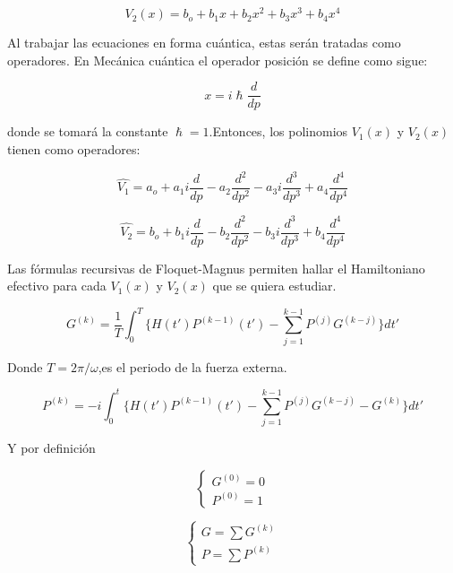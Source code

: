 \begin{equation}
    V_2(x) = b_o + b_1x + b_2x^2 + b_3x^3 + b_4x^4
\end{equation}

Al trabajar las ecuaciones en forma cuántica, estas serán tratadas como operadores. En Mecánica cuántica el operador posición se define como sigue:

\begin{equation}
    x = i \hslash \frac{d}{dp} 
\end{equation}

donde se tomará la constante $\hslash = 1$.Entonces, los polinomios $V_1(x)$ y $V_2(x)$ tienen como operadores:  

\begin{equation}
    \hat{V_1} = a_o + a_1 i \frac{d}{dp} - a_2 \frac{d^2}{dp^2} - a_3 i \frac{d^3}{dp^3} + a_4\frac{d^4}{dp^4} 
\end{equation}

\begin{equation}
    \hat{V_2} = b_o + b_1 i \frac{d}{dp} - b_2 \frac{d^2}{dp^2} - b_3 i \frac{d^3}{dp^3} + b_4\frac{d^4}{dp^4} 
\end{equation}

Las fórmulas recursivas de Floquet-Magnus permiten hallar el Hamiltoniano efectivo para cada $V_1(x)$ y $V_2(x)$ que se quiera estudiar. 

\begin{equation}
    G^{(k)}=\frac{1}{T}\int^{T}_{0}\{ H(t')P^{(k-1)}(t')-\sum^{k-1}_{j=1} P^{(j)}G^{(k-j)}\}dt'
\end{equation}

Donde $T=2\pi/\omega$,es el periodo de la fuerza externa.

\begin{equation}
    P^{(k)}=-i\int^{t}_{0}\{ H(t')P^{(k-1)}(t')-\sum^{k-1}_{j=1} P^{(j)}G^{(k-j)}-G^{(k)}\}dt'
\end{equation}

Y por definición 

\begin{equation}
    \begin{cases}
        G^{(0)}=0\\
        P^{(0)}=1
    \end{cases}
\end{equation}

\begin{equation}
\begin{cases}
    G=\sum G^{(k)}\\
    P=\sum P^{(k)}
    \end{cases}
\end{equation}

